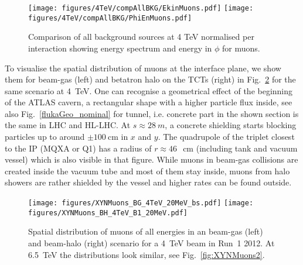 \begin{figure}%
\begin{center}
  \texttt{[image: figures/4TeV/compAllBKG/EkinMuons.pdf]}
  \texttt{[image: figures/4TeV/compAllBKG/PhiEnMuons.pdf]}
\end{center}
\vspace{-0.6cm}
 \caption{Comparison of all background sources at 4 TeV normalised per interaction showing energy spectrum and energy in $\phi$ for muons.
  \label{fig:compAllBKG_muons}}
\end{figure}
To visualise the spatial distribution of muons at the interface plane, we show them for beam-gas (left) and betatron halo on the TCTs (right) in Fig.~\ref{fig:XYNMuons} for the same scenario at 4~TeV. One can recognise a geometrical effect of the beginning of the ATLAS cavern, a rectangular shape with a higher particle flux inside, see also Fig.~\ref{flukaGeo_nominal} for tunnel, i.e. concrete part in the shown section is the same in LHC and HL-LHC. At $s \approx 28~m$, a concrete shielding starts blocking particles up to around $\pm 100~$cm in $x$ and $y$. The quadrupole of the triplet closest to the IP (MQXA or Q1) has a radius of $r \approx 46~$~cm (including tank and vacuum vessel) which is also visible in that figure. While muons in beam-gas collisions are created inside the vacuum tube and most of them stay inside, muons from halo showers are rather shielded by the vessel and higher rates can be found outside.


\begin{figure} %
  \centering
  \texttt{[image: figures/XYNMuons\_BG\_4TeV\_20MeV\_bs.pdf]}
  \texttt{[image: figures/XYNMuons\_BH\_4TeV\_B1\_20MeV.pdf]}
  \caption{Spatial distribution of muons of all energies in an beam-gas (left) and beam-halo (right) scenario for a 4~TeV beam in Run~1 2012. At 6.5~TeV the distributions look similar, see Fig.~\ref{fig:XYNMuons2}.
    \label{fig:XYNMuons}}
\end{figure}


